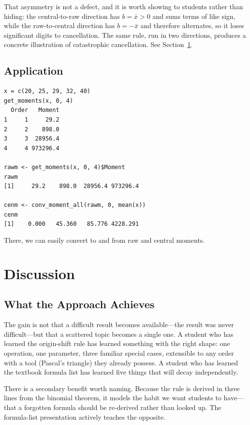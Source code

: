 \documentclass[
  12pt]{article}
\begin{document}
That asymmetry is not a defect, and it is worth showing to students rather than hiding: the central-to-raw direction has $b = \bar{x} > 0$ and sums terms of like sign, while the raw-to-central direction has $b = -\bar{x}$ and therefore alternates, so it loses significant digits to cancellation. The same rule, run in two directions, produces a concrete illustration of catastrophic cancellation. See Section~\ref{sec-discussion}.

\subsection{Application}

\begin{verbatim}
x = c(20, 25, 29, 32, 40)
get_moments(x, 0, 4)
  Order   Moment
1     1     29.2
2     2    898.0
3     3  28956.4
4     4 973296.4

rawm <- get_moments(x, 0, 4)$Moment
rawm
[1]     29.2    898.0  28956.4 973296.4

cenm <- conv_moment_all(rawm, 0, mean(x))
cenm
[1]    0.000   45.360   85.776 4228.291
\end{verbatim}


There, we can easily convert to and from raw and central moments. 

\section{Discussion}\label{sec-discussion}

\subsection{What the Approach Achieves}

The gain is not that a difficult result becomes available---the result was never difficult---but that a scattered topic becomes a single one. A student who has learned the origin-shift rule has learned something with the right shape: one operation, one parameter, three familiar special cases, extensible to any order with a tool (Pascal's triangle) they already possess. A student who has learned the textbook formula list has learned five things that will decay independently.

There is a secondary benefit worth naming. Because the rule is derived in three lines from the binomial theorem, it models the habit we want students to have---that a forgotten formula should be re-derived rather than looked up. The formula-list presentation actively teaches the opposite.
\end{document}
